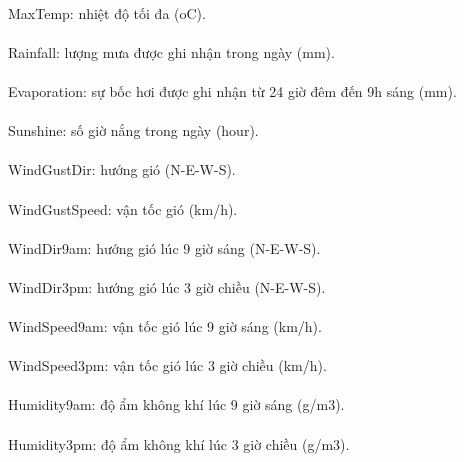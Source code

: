 \documentclass{article}
\begin{document}
\paragraph{} MaxTemp: nhiệt độ tối đa (oC).
\paragraph{} Rainfall: lượng mưa được ghi nhận trong ngày (mm).
\paragraph{} Evaporation: sự bốc hơi được ghi nhận từ 24 giờ đêm đến 9h sáng (mm).
\paragraph{} Sunshine: số giờ nắng trong ngày (hour).
\paragraph{} WindGustDir: hướng gió (N-E-W-S).
\paragraph{} WindGustSpeed: vận tốc gió (km/h).
\paragraph{} WindDir9am: hướng gió lúc 9 giờ sáng (N-E-W-S).
\paragraph{} WindDir3pm: hướng gió lúc 3 giờ chiều (N-E-W-S).
\paragraph{} WindSpeed9am: vận tốc gió lúc 9 giờ sáng (km/h).
\paragraph{} WindSpeed3pm: vận tốc gió lúc 3 giờ chiều (km/h).
\paragraph{} Humidity9am: độ ẩm không khí lúc 9 giờ sáng (g/m3).
\paragraph{} Humidity3pm: độ ẩm không khí lúc 3 giờ chiều (g/m3).
\end{document}
